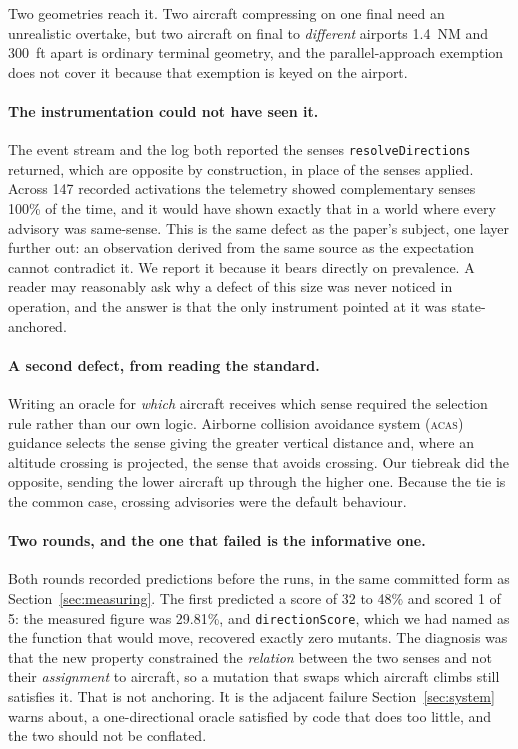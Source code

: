 \documentclass[12pt]{article}
\begin{document}
Two geometries reach it. Two aircraft compressing on one final need an unrealistic
overtake, but two aircraft on final to \emph{different} airports 1.4~NM and 300~ft
apart is ordinary terminal geometry, and the parallel-approach exemption does not
cover it because that exemption is keyed on the airport.

\paragraph{The instrumentation could not have seen it.} The event stream and the
log both reported the senses \texttt{resolveDirections} returned, which are opposite by construction, in place of the senses applied. Across 147 recorded
activations the telemetry showed complementary senses 100\% of the
time, and it would have shown exactly that in a world where every advisory was
same-sense. This is the same defect as the paper's subject, one layer further
out: an observation derived from the same source as the expectation cannot
contradict it. We report it because it bears directly on prevalence. A reader may
reasonably ask why a defect of this size was never noticed in operation, and the
answer is that the only instrument pointed at it was state-anchored.

\paragraph{A second defect, from reading the standard.} Writing an oracle for
\emph{which} aircraft receives which sense required the selection rule rather
than our own logic. Airborne collision avoidance system (\textsc{acas}) guidance selects the sense
giving the greater
vertical distance and, where an altitude crossing is projected, the sense that
avoids crossing. Our tiebreak did the opposite, sending the lower aircraft up
through the higher one. Because the tie is the common case, crossing advisories
were the default behaviour.

\paragraph{Two rounds, and the one that failed is the informative one.} Both
rounds recorded predictions before the runs, in the same committed form as
Section~\ref{sec:measuring}. The first predicted a score of 32 to 48\% and scored
1 of 5: the measured figure was 29.81\%, and \texttt{directionScore}, which we had
named as the function that would move, recovered exactly zero mutants. The
diagnosis was that the new property constrained the \emph{relation} between the
two senses and not their \emph{assignment} to aircraft, so a mutation that swaps
which aircraft climbs still satisfies it. That is not anchoring. It is the
adjacent failure Section~\ref{sec:system} warns about, a one-directional oracle
satisfied by code that does too little, and the two should not be conflated.
\end{document}
